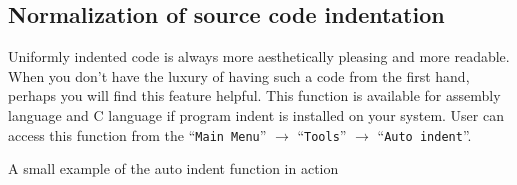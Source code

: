 \documentclass[a4paper,twoside,12pt]{book}
\newcommand{\menuitem}[1]{\texttt{#1}}
\begin{document}
		\subsection{Normalization of source code indentation}
			Uniformly indented code is always more aesthetically pleasing and more readable. When you don't have the luxury of having such a code from the first hand, perhaps you will find this feature helpful. This function is available for assembly language and C language if program indent is installed on your system. User can access this function from the ``\menuitem{Main Menu}'' $\rightarrow$ ``\menuitem{Tools}'' $\rightarrow$ ``\menuitem{Auto indent}''.

			\noindent
			\begin{center}
				\small{A small example of the auto indent function in action}
			\end{center}
\end{document}
